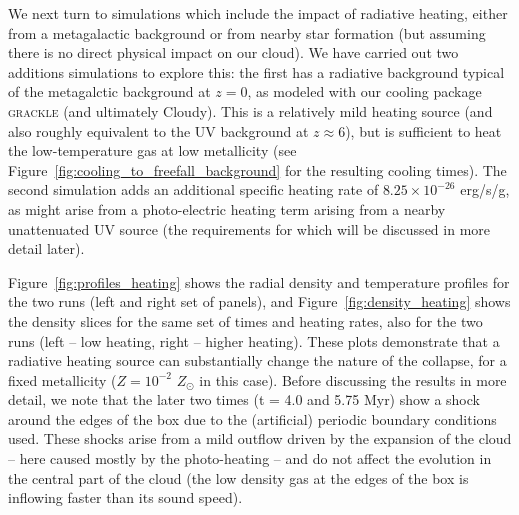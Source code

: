 \documentclass[useAMS,usenatbib]{mn2e}
\begin{document}
We next turn to simulations which include the impact of radiative heating, either from a metagalactic background or from nearby star
formation (but assuming there is no direct physical impact on our cloud).  We have carried out two additions simulations to explore
this: the first has a radiative background typical of the \citet{Haardt2012} metagalctic background at $z=0$, as modeled with our
cooling package \textsc{grackle} (and ultimately Cloudy).  This is a relatively mild heating source (and also roughly equivalent to the UV background at $z \approx 6$), but is sufficient to heat the
low-temperature gas at low metallicity (see Figure~\ref{fig:cooling_to_freefall_background} for the resulting cooling times).
The second simulation adds an additional specific heating rate of $8.25\times10^{-26}$ erg/s/g, as might arise from a photo-electric
heating term arising from a nearby unattenuated UV source (the requirements for which will be discussed in more detail later).



Figure~\ref{fig:profiles_heating} shows the radial density and temperature profiles for the two runs (left and right set of panels),
and Figure~\ref{fig:density_heating} shows the density slices for the same set of times and heating rates, also for the two runs
(left -- low heating, right -- higher heating). These plots demonstrate that a radiative heating source can substantially change
the nature of the collapse, for a fixed metallicity ($Z=10^{-2}$ $Z_\odot$ in this case).   Before discussing the results in more detail,
we note that the later two times (t = 4.0 and 5.75 Myr) show a shock around the edges of the box due to the (artificial) periodic
boundary conditions used.   These shocks arise from a mild outflow driven by the expansion of the cloud -- here caused mostly by the photo-heating --
and do not affect the evolution in the central part of the cloud (the low density gas at the edges of the box is inflowing faster than its sound speed).
\end{document}
